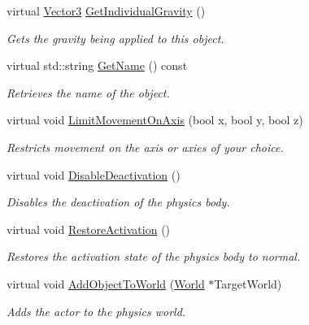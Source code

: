 \begin{DoxyCompactItemize}
virtual \hyperlink{classphys_1_1Vector3}{Vector3} \hyperlink{classphys_1_1ActorRigid_ab03a2b5f332b0bb505076cf88a5512f6}{GetIndividualGravity} ()
\begin{DoxyCompactList}\small\item\em Gets the gravity being applied to this object. \item\end{DoxyCompactList}\item 
virtual std::string \hyperlink{classphys_1_1ActorRigid_a63952e0b7ab7176ae60d96756dd84b43}{GetName} () const 
\begin{DoxyCompactList}\small\item\em Retrieves the name of the object. \item\end{DoxyCompactList}\item 
virtual void \hyperlink{classphys_1_1ActorRigid_adaed962ee8ed788612e541fb00867c78}{LimitMovementOnAxis} (bool x, bool y, bool z)
\begin{DoxyCompactList}\small\item\em Restricts movement on the axis or axies of your choice. \item\end{DoxyCompactList}\item 
virtual void \hyperlink{classphys_1_1ActorRigid_ad74da4da12bbb44b3e5ae22007c98573}{DisableDeactivation} ()
\begin{DoxyCompactList}\small\item\em Disables the deactivation of the physics body. \item\end{DoxyCompactList}\item 
virtual void \hyperlink{classphys_1_1ActorRigid_a99af341e186505a330f6634b7f6ad542}{RestoreActivation} ()
\begin{DoxyCompactList}\small\item\em Restores the activation state of the physics body to normal. \item\end{DoxyCompactList}\item 
virtual void \hyperlink{classphys_1_1ActorRigid_acaf29ca7058b39185dd09a5059200e91}{AddObjectToWorld} (\hyperlink{classphys_1_1World}{World} $\ast$TargetWorld)
\begin{DoxyCompactList}\small\item\em Adds the actor to the physics world. \item\end{DoxyCompactList}\item 

\end{DoxyCompactItemize}
